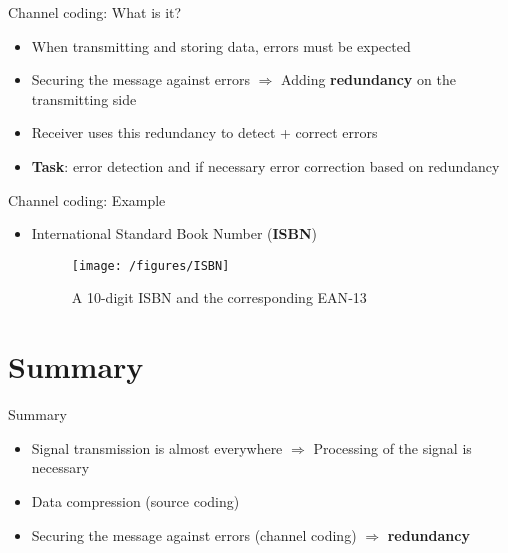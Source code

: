 \documentclass[ngerman]{beamer}
\begin{document}
\begin{frame}{Channel coding: What is it?}
	\begin{itemize}[label={-}, itemsep=2ex]
		\item When transmitting and storing data, \alert{errors} must be expected
		\item Securing the message against errors\newline
		 $\Longrightarrow$ Adding \textbf{\alert{redundancy}} on the transmitting side
		\item Receiver uses this redundancy to detect + correct errors
		\item \textbf{Task}: \alert{error detection} and if necessary \alert{error correction} based on redundancy	
	\end{itemize}	  
\end{frame}


\begin{frame}{Channel coding: Example}
	\begin{itemize}[label={-}, itemsep=2ex]
		\item International Standard Book Number (\textbf{ISBN})
		\begin{figure}[htbp]
 	 		\centering 	
 			\texttt{[image: /figures/ISBN]} 	 
 			\caption {A 10-digit ISBN and the corresponding EAN‑13 \cite{isbn}}
		\end{figure}
	\end{itemize}
\end{frame}

\section{Summary}
\begin{frame}{Summary}
	\begin{itemize}[label={-}, itemsep=2ex]
		\item Signal transmission is almost everywhere\newline\newline
		$\Rightarrow$ Processing of the signal is necessary
		\item Data compression (source coding)			
		\item Securing the message against errors (channel coding)\newline
		 $\Rightarrow$ \textbf{\alert{redundancy}}
	\end{itemize}  
\end{frame}
\end{document}
